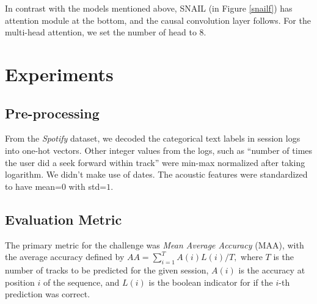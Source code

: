 In contrast with the models mentioned above, SNAIL\cite{snail} (in Figure \ref{snailf}) has attention module at the bottom, and the causal convolution layer follows. For the multi-head attention, we set the number of head to 8.  

\section{Experiments}
\subsection{Pre-processing}
From the {\it Spotify} dataset\cite{brost2019music}, we decoded the categorical text labels in session logs into one-hot vectors. Other integer values from the logs, such as ``number of times the user did a seek forward within track'' were min-max normalized after taking logarithm. We didn't make use of dates. The acoustic  features were standardized to have mean=$0$ with std=$1$.
\subsection{Evaluation Metric}
The primary metric for the challenge was {\it Mean Average Accuracy} (MAA), with the average accuracy defined by
\begin{math}
AA = \sum_{i=1}^T A(i)L(i) / {T},
\end{math} 
where $T$ is the number of tracks to be predicted for the given session, $A(i)$ is the accuracy at position $i$ of the sequence, and $L(i)$ is the boolean indicator for if the $i$-th prediction was correct.
